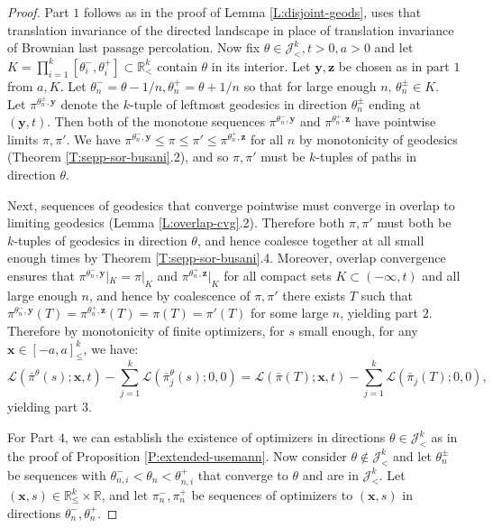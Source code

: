 \documentclass[11pt]{article}
\newcommand{\R}{\mathbb{R}}
\newcommand{\cJ}{\mathcal{J}}
\newcommand{\cL}{\mathcal{L}}
\newcommand{\X}{\times}
\newcommand{\bx}{\mathbf{x}}
\newcommand{\by}{\mathbf{y}}
\newcommand{\bz}{\mathbf{z}}
\theoremstyle{definition} %
\theoremstyle{remark} %
\begin{document}
\begin{proof}
Part $1$ follows as in the proof of Lemma \ref{L:disjoint-geods}, uses that translation invariance of the directed landscape in place of translation invariance of Brownian last passage percolation. Now fix $\theta \in \cJ^k_<, t > 0, a > 0$ and let $K =\prod_{i=1}^k [\theta_i^-, \theta_i^+]\subset \R^k_<$ contain $\theta$ in its interior. Let $\by, \bz$ be chosen as in part $1$ from $a, K$. Let $\theta_n^- = \theta - 1/n, \theta_n^+ = \theta + 1/n$ so that for large enough $n$, $\theta_n^{\pm} \in K$. Let $\pi^{\theta_n^\pm, \by}$ denote the $k$-tuple of leftmost geodesics in direction $\theta_n^\pm$ ending at $(\by, t)$. Then both of the monotone sequences $\pi^{\theta_n^-, \by}$ and $\pi^{\theta_n^+, \bz}$ have pointwise limits $\pi, \pi'$. We have $\pi^{\theta_n^-, \by} \le \pi \le \pi' \le \pi^{\theta_n^+, \bz}$ for all $n$ by monotonicity of geodesics (Theorem \ref{T:sepp-sor-busani}.2), and so $\pi, \pi'$ must be $k$-tuples of paths in direction $\theta$.

 Next, sequences of geodesics that converge pointwise must converge in overlap to limiting geodesics (Lemma \ref{L:overlap-cvg}.2). Therefore both $\pi, \pi'$ must both be $k$-tuples of geodesics in direction $\theta$, and hence coalesce together at all small enough times by Theorem \ref{T:sepp-sor-busani}.4. Moreover, overlap convergence ensures that $\pi^{\theta_n^-, \by}|_K = \pi|_K$ and ${\pi}^{\theta_n^+, \bz}|_K$ for all compact sets $K \subset (-\infty, t)$ and all large enough $n$, and hence by coalescence of $\pi, \pi'$ there exists $T$ such that $\pi^{\theta_n^-, \by}(T) = {\pi}^{\theta_n^+, \bz}(T) = \pi(T)=\pi'(T)$ for some large $n$, yielding part $2$. Therefore by monotonicity of finite optimizers, for $s$ small enough, for any $\bx \in [-a, a]^k_\le$, we have:
 $$
 \cL( \bar \pi^\theta(s) ; \bx, t) - \sum_{j=1}^{k} \cL(\bar \pi^\theta_j(s); 0, 0) =  \cL( \bar \pi(T); \bx, t) - \sum_{j=1}^{k} \cL(\bar \pi_j(T); 0, 0),
 $$
 yielding part $3$.
 
 For Part $4$, we can establish the existence of optimizers in directions $\theta \in \cJ^k_<$ as in the proof of Proposition \ref{P:extended-usemann}. Now consider $\theta \notin \cJ^k_<$ and let $\theta_n^\pm$ be sequences with $\theta_{n, i}^- < \theta_n < \theta_{n, i}^+$ that converge to $\theta$ and are in $\cJ^k_<$. Let $(\bx, s)\in \R^k_\le \X \R$, and let $\pi_n^-, \pi_n^+$ be sequences of optimizers to $(\bx, s)$ in directions $\theta_n^-, \theta_n^+$. 
 

\end{proof}
\end{document}
